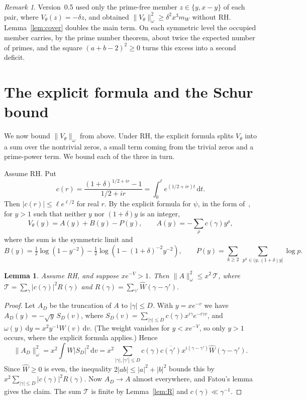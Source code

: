 \documentclass[11pt]{amsart}
\newtheorem{lemma}[theorem]{Lemma}
\theoremstyle{remark}
\newtheorem*{remark*}{Remark}
\newcommand{\dd}{\,\mathrm{d}}
\newcommand{\Wh}{\widehat W}
\begin{document}
\begin{remark*}
Version~0.5 used only the prime-free member $z\in\{y,x-y\}$ of each pair, where $V_\theta(z)=-\delta z$, and obtained $\|V_\theta\|_\omega^2\ge\delta^2x^3m_W$ without RH. Lemma~\ref{lem:cover} doubles the main term. On each symmetric level the occupied member carries, by the prime number theorem, about twice the expected number of primes, and the square $(a+b-2)^2\ge0$ turns this excess into a second deficit.
\end{remark*}

\section{The explicit formula and the Schur bound}\label{sec:schur}

We now bound $\|V_\theta\|_\omega$ from above. Under RH, the explicit formula splits $V_\theta$ into a sum over the nontrivial zeros, a small term coming from the trivial zeros and a prime-power term. We bound each of the three in turn.

Assume RH. Put
\[
c(r)=\frac{(1+\delta)^{1/2+ir}-1}{1/2+ir}=\int_0^\ell e^{(1/2+ir)t}\dd t .
\]
Then $|c(r)|\le\ell e^{\ell/2}$ for real $r$. By the explicit formula for $\psi$, in the form of~\cite[eq.~(3.2)]{CH}, for $y>1$ such that neither $y$ nor $(1+\delta)y$ is an integer,
\[
V_\theta(y)=A(y)+B(y)-P(y),\qquad A(y)=-\sum_\rho c(\gamma)y^\rho,
\]
where the sum is the symmetric limit and
\[
B(y)=\tfrac12\log(1-y^{-2})-\tfrac12\log(1-(1+\delta)^{-2}y^{-2}),\qquad P(y)=\sum_{k\ge2}\ \sum_{p^k\in(y,(1+\delta)y]}\log p .
\]

\begin{lemma}\label{lem:schur}
Assume RH, and suppose $xe^{-V}>1$. Then $\|A\|_\omega^2\le x^2\,\mathcal T$, where $\mathcal T=\sum_\gamma|c(\gamma)|^2R(\gamma)$ and $R(\gamma)=\sum_{\gamma'}\Wh(\gamma-\gamma')$.
\end{lemma}

\begin{proof}
Let $A_D$ be the truncation of $A$ to $|\gamma|\le D$. With $y=xe^{-v}$ we have $A_D(y)=-\sqrt y\,S_D(v)$, where $S_D(v)=\sum_{|\gamma|\le D}c(\gamma)x^{i\gamma}e^{-i\gamma v}$, and $\omega(y)\dd y=x^2y^{-1}W(v)\dd v$. (The weight vanishes for $y<xe^{-V}$, so only $y>1$ occurs, where the explicit formula applies.) Hence
\[
\|A_D\|_\omega^2=x^2\int W|S_D|^2\dd v=x^2\sum_{|\gamma|,|\gamma'|\le D}c(\gamma)\overline{c(\gamma')}x^{i(\gamma-\gamma')}\Wh(\gamma-\gamma').
\]
Since $\Wh\ge0$ is even, the inequality $2|ab|\le|a|^2+|b|^2$ bounds this by $x^2\sum_{|\gamma|\le D}|c(\gamma)|^2R(\gamma)$. Now $A_D\to A$ almost everywhere, and Fatou's lemma gives the claim. The sum $\mathcal T$ is finite by Lemma~\ref{lem:R} and $c(\gamma)\ll\gamma^{-1}$.
\end{proof}
\end{document}
